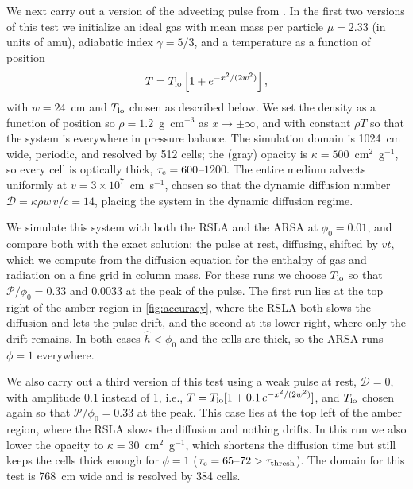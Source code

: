 \documentclass[preprint,12pt,authoryear]{elsarticle}
\newcommand{\calP}{\mathcal{P}}
\newcommand{\calD}{\mathcal{D}}
\begin{document}
We next carry out a version of the advecting pulse from \citet{Krumholz07b}. In the first two versions of this test we initialize an ideal gas with mean mass per particle $\mu = 2.33$ (in units of amu), adiabatic index $\gamma=5/3$, and a temperature as a function of position
\begin{equation}
    T = T_{\rm lo}\left[1 + e^{-x^2/(2w^2)}\right],
    \label{eq:pulse}
\end{equation}
with $w = 24$~cm and $T_{\rm lo}$ chosen as described below. We set the density as a function of position so $\rho = 1.2$~g~cm$^{-3}$ as $x\to \pm\infty$, and with constant $\rho T$ so that the system is everywhere in pressure balance. The simulation domain is 1024~cm wide, periodic, and resolved by 512 cells; the (gray) opacity is $\kappa = 500$~cm$^2$~g$^{-1}$, so every cell is optically thick, $\tau_{\rm c} = 600$--$1200$. The entire medium advects uniformly at $v = 3\times10^7$~cm~s$^{-1}$, chosen so that the dynamic diffusion number $\calD = \kappa\rho w\,v/c = 14$, placing the system in the dynamic diffusion regime.

We simulate this system with both the RSLA and the ARSA at $\phi_0 = 0.01$, and compare both with the exact solution: the pulse at rest, diffusing, shifted by $vt$, which we compute from the diffusion equation for the enthalpy of gas and radiation on a fine grid in column mass. For these runs we choose $T_{\rm lo}$ so that $\calP/\phi_0 = 0.33$ and $0.0033$ at the peak of the pulse. The first run lies at the top right of the amber region in \autoref{fig:accuracy}, where the RSLA both slows the diffusion and lets the pulse drift, and the second at its lower right, where only the drift remains. In both cases $\hat{h} < \phi_0$ and the cells are thick, so the ARSA runs $\phi = 1$ everywhere.


We also carry out a third version of this test using a weak pulse at rest, $\calD = 0$, with amplitude $0.1$ instead of 1, i.e., $T = T_{\rm lo}[1 + 0.1\,e^{-x^2/(2w^2)}]$, and $T_{\rm lo}$ chosen again so that $\calP/\phi_0 = 0.33$ at the peak. This case lies at the top left of the amber region, where the RSLA slows the diffusion and nothing drifts. In this run we also lower the opacity to $\kappa = 30$~cm$^2$~g$^{-1}$, which shortens the diffusion time but still keeps the cells thick enough for $\phi = 1$ ($\tau_{\rm c} = 65$--$72 > \tau_{\rm thresh}$). The domain for this test is 768~cm wide and is resolved by 384 cells.
\end{document}
